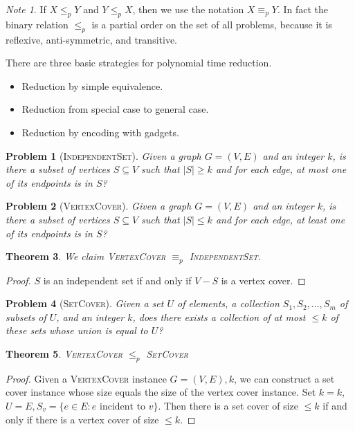 \documentclass[10pt, oneside, reqno]{amsart}
\theoremstyle{plain}%
\newtheorem{thm}{Theorem}[section]
\newtheorem{prob}[thm]{Problem}
\theoremstyle{definition}
\theoremstyle{remark}
\newtheorem*{note}{Note}
\begin{document}
\begin{note}
	If $X \leq_p Y$ and $Y \leq_p X$, then we use the notation $X \equiv_p Y$.  In fact the binary relation $\leq_p$ is a partial order on the set of all problems, because it is reflexive, anti-symmetric, and transitive.
\end{note}

There are three basic strategies for polynomial time reduction.

\begin{itemize}
	\item Reduction by simple equivalence.
	\item Reduction from special case to general case.
	\item Reduction by encoding with gadgets.
\end{itemize}

\begin{prob}[\textsc{IndependentSet}]
	Given a graph $G = (V,E)$ and an integer $k$, is there a subset of vertices $S \subseteq V$ such that $|S| \geq k$ and for each edge, at most one of its endpoints is in $S$?
\end{prob}

\begin{prob}[\textsc{VertexCover}]
	Given a graph $G = (V,E)$ and an integer $k$, is there a subset of vertices $S \subseteq V$ such that $|S| \leq k$ and for each edge, at least one of its endpoints is in $S$?
\end{prob}

\begin{thm}
	We claim \textsc{VertexCover} $\equiv_p$ \textsc{IndependentSet}. 
\end{thm}

\begin{proof}
	$S$ is an independent set if and only if $V - S$ is a vertex cover.
\end{proof}

\begin{prob}[\textsc{SetCover}]
	Given a set $U$ of elements, a collection $S_1, S_2,\dots, S_m$ of subsets of $U$, and an integer $k$, does there exists a collection of at most $\leq k$ of these sets whose union is equal to $U$?
\end{prob}

\begin{thm}
	\textsc{VertexCover} $\leq_p$ \textsc{SetCover}
\end{thm}
\begin{proof}
	Given a \textsc{VertexCover} instance $G = (V,E), k$, we can construct a set cover instance whose size equals the size of the vertex cover instance. Set $k = k$, $U = E, S_v = \{e \in E : e \text{ incident to } v\}$.
	Then there is a set cover of size $\leq k$ if and only if there is a vertex cover of size $\leq k$.
\end{proof}
\end{document}
